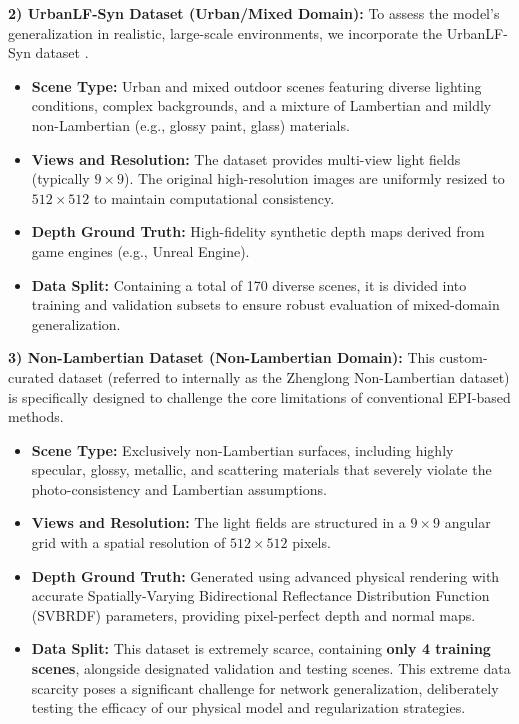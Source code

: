 \documentclass[lettersize,journal]{IEEEtran}
\begin{document}
\textbf{2) UrbanLF-Syn Dataset (Urban/Mixed Domain):} 
To assess the model's generalization in realistic, large-scale environments, we incorporate the UrbanLF-Syn dataset \cite{ref}. 
\begin{itemize}
    \item \textbf{Scene Type:} Urban and mixed outdoor scenes featuring diverse lighting conditions, complex backgrounds, and a mixture of Lambertian and mildly non-Lambertian (e.g., glossy paint, glass) materials.
    \item \textbf{Views and Resolution:} The dataset provides multi-view light fields (typically $9 \times 9$). The original high-resolution images are uniformly resized to $512 \times 512$ to maintain computational consistency.
    \item \textbf{Depth Ground Truth:} High-fidelity synthetic depth maps derived from game engines (e.g., Unreal Engine).
    \item \textbf{Data Split:} Containing a total of 170 diverse scenes, it is divided into training and validation subsets to ensure robust evaluation of mixed-domain generalization.
\end{itemize}

\textbf{3) Non-Lambertian Dataset (Non-Lambertian Domain):} 
This custom-curated dataset (referred to internally as the Zhenglong Non-Lambertian dataset) is specifically designed to challenge the core limitations of conventional EPI-based methods. 
\begin{itemize}
    \item \textbf{Scene Type:} Exclusively non-Lambertian surfaces, including highly specular, glossy, metallic, and scattering materials that severely violate the photo-consistency and Lambertian assumptions.
    \item \textbf{Views and Resolution:} The light fields are structured in a $9 \times 9$ angular grid with a spatial resolution of $512 \times 512$ pixels.
    \item \textbf{Depth Ground Truth:} Generated using advanced physical rendering with accurate Spatially-Varying Bidirectional Reflectance Distribution Function (SVBRDF) parameters, providing pixel-perfect depth and normal maps.
    \item \textbf{Data Split:} This dataset is extremely scarce, containing \textbf{only 4 training scenes}, alongside designated validation and testing scenes. This extreme data scarcity poses a significant challenge for network generalization, deliberately testing the efficacy of our physical model and regularization strategies.
\end{itemize}
\end{document}
